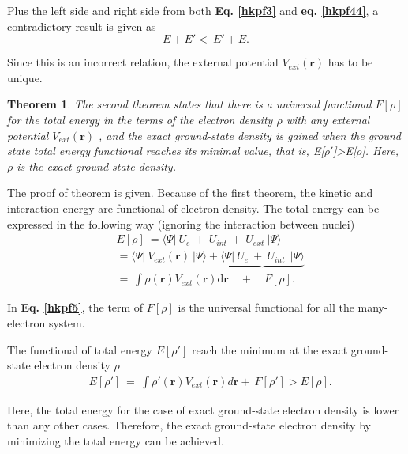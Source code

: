 \documentclass[a4paper, 12pt, titlepage,oneside,drop]{kthesis}
\newtheorem{thm}{Theorem}
\begin{document}
Plus the left side and right side from both \textbf{Eq. \ref{hkpf3}} and \textbf{eq. \ref{hkpf44}}, a contradictory result is given as
\begin{equation}\label{hkpf4}
  E + E'  < \  E' + E.
\end{equation}

Since this is an incorrect relation, the external potential $V_{ext}(\textbf{r})$ has to be unique.

\begin{thm}
\label{hk2}
\noindent The second theorem states that there is a universal functional $F[\rho]$ for the total energy in the terms of the electron density $\rho$ with any external potential $V_{ext}(\textbf{r})$ ,
and the exact ground-state density is gained when the ground state total energy functional reaches its minimal value, that is, E[$\rho'$]>E[$\rho$]. Here, $\rho$ is the exact ground-state density.
\end{thm}

The proof of theorem is given. Because of the first theorem, the kinetic and interaction energy are functional of electron density. The total energy can be expressed in the following way (ignoring the interaction between nuclei)
\begin{equation}\label{hkpf5}\begin{split}
& E[\rho] \ = \langle \Psi  | \ {U_e} \ + \ {U}_{int}  \ + \ {U}_{ext} \ | \Psi \rangle \\
&     = \langle \Psi  | \ {V}_{ext}(\textbf{r}) \ | \Psi \rangle  + \underbrace{\langle \Psi  | \ {U_e} \ + \ {U}_{int}  \ \ | \Psi \rangle}  \\
&     =   \ \int \rho(\textbf{r}) V_{ext}(\textbf{r}) \mathrm{d}\textbf{r} \quad +  \quad F[\rho]. 
\end{split}
\end{equation}

In \textbf{Eq. \ref{hkpf5}}, the term of $F[\rho]$ is the universal functional for all the many-electron system.

The functional of total energy $E[\rho']$ reach the minimum at the exact ground-state electron density $\rho$
\begin{equation}\begin{split}
 & E[\rho'] \ =   \ \int \rho'(\textbf{r}) V_{ext}(\textbf{r}) d \textbf{r}   + \  F[\rho'] > E[\rho]. 
\end{split}
\end{equation}
 
Here, the total energy for the case of exact ground-state electron density is lower than any other cases. Therefore, the exact ground-state electron density by minimizing the total energy can be achieved.
\end{document}
